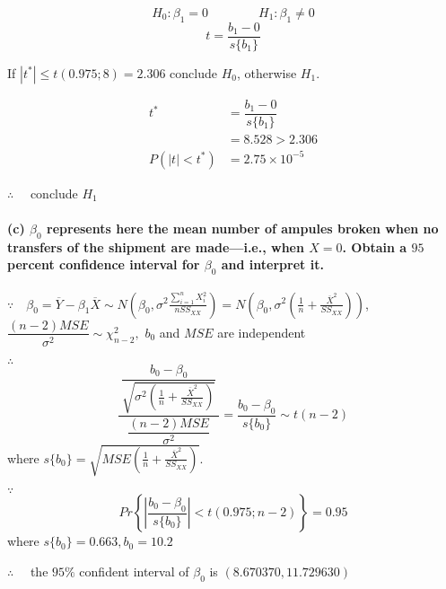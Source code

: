 \documentclass[]{article}
\let\oldparagraph\paragraph
\renewcommand{\paragraph}[1]{\oldparagraph{#1}\mbox{}}
\begin{document}
\[H_0:\beta_1=0\qquad\qquad H_1:\beta_1\neq 0\]
\[t=\dfrac{b_1-0}{s\{b_1\}}\]

If \(|t^*|\leqslant t(0.975;8)=2.306\) conclude \(H_0\), otherwise
\(H_1\).

\begin{align*}
t^*&=\dfrac{b_1-0}{s\{b_1\}}\\
&=8.528>2.306\\
P(|t|<t^*)&=2.75\times 10^{-5}
\end{align*}

\(\therefore\quad\) conclude \(H_1\)

\paragraph{\texorpdfstring{(c) \(\beta_0\) represents here the mean
number of ampules broken when no transfers of the shipment are
made---i.e., when \(X = 0\). Obtain a \(95\) percent confidence interval
for \(\beta_0\) and interpret
it.}{(c) \textbackslash{}beta\_0 represents here the mean number of ampules broken when no transfers of the shipment are made---i.e., when X = 0. Obtain a 95 percent confidence interval for \textbackslash{}beta\_0 and interpret it.}}\label{c-beta_0-represents-here-the-mean-number-of-ampules-broken-when-no-transfers-of-the-shipment-are-madei.e.-when-x-0.-obtain-a-95-percent-confidence-interval-for-beta_0-and-interpret-it.}

\(\because\quad\beta_0=\overline{Y}-\beta_1\overline{X}\sim N\left(\beta_0,\sigma^2\frac{\sum\limits_{i=1}^nX_i^2}{nSS_{XX}}\right)=N\left(\beta_0,\sigma^2\left(\frac{1}{n}+\frac{\overline{X}^2}{SS_{XX}}\right)\right)\),
\(\dfrac{(n-2)MSE}{\sigma^2}\sim\chi^2_{n-2},\) \(b_0\) and \(MSE\) are
independent

\(\therefore\quad\)
\[\dfrac{\ \dfrac{b_0-{\beta}_0}{ \sqrt{{\sigma}^2 \left(\frac{1}{n}+\frac{\overline{X}^2}{SS_{XX}} \right)}} \  }{\dfrac{(n-2)MSE}{\sigma^2}}=\dfrac{b_0-\beta_0}{s\{b_0\}}\sim t(n-2)\]
where
\(s\{b_0\}=\sqrt{MSE \left(\frac{1}{n}+\frac{\overline{X}^2}{SS_{XX}} \right)}\).

\(\because\quad\)
\[Pr\left\{\left|\dfrac{b_0-\beta_0}{s\{b_0\}}\right|<t(0.975;n-2)\right\}=0.95\]
where \(s\{b_0\}=0.663,b_0=10.2\)

\(\therefore\quad\) the \(95\%\) confident interval of \(\beta_0\) is
\((8.670370,11.729630)\)
\end{document}
